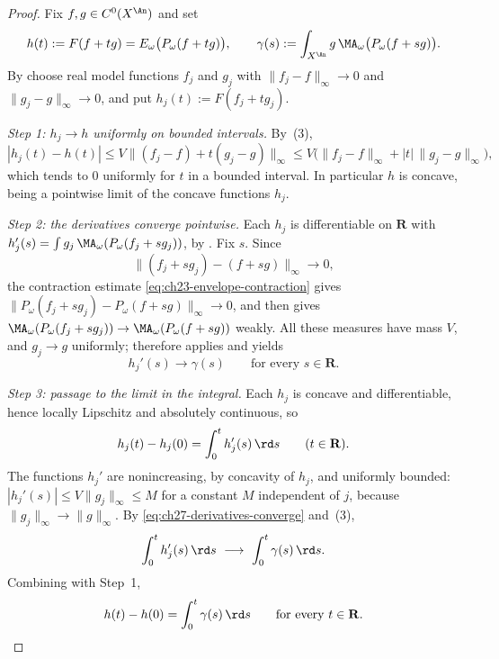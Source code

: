 \begin{proof}
Fix \(f,g\in C^0(X^{\An})\) and set
\[
 h(t):=F(f+tg)=E_\omega\bigl(P_\omega(f+tg)\bigr),
 \qquad
 \gamma(s):=\int_{X^{\An}}g\,\MA_\omega\bigl(P_\omega(f+sg)\bigr).
\]
By  choose real model functions \(f_j\) and
\(g_j\) with
\(\lVert f_j-f\rVert_\infty\to0\) and \(\lVert g_j-g\rVert_\infty\to0\), and
put \(h_j(t):=F(f_j+tg_j)\).

\emph{Step 1: \(h_j\to h\) uniformly on bounded intervals.}
By \,(3),
\[
 |h_j(t)-h(t)|
 \leq V\lVert (f_j-f)+t(g_j-g)\rVert_\infty
 \leq V\bigl(\lVert f_j-f\rVert_\infty
       +|t|\,\lVert g_j-g\rVert_\infty\bigr),
\]
which tends to \(0\) uniformly for \(t\) in a bounded interval.  In
particular \(h\) is concave, being a pointwise limit of the concave
functions \(h_j\).

\emph{Step 2: the derivatives converge pointwise.}
Each \(h_j\) is differentiable on \(\mathbf R\) with
\(h_j'(s)=\int g_j\,\MA_\omega(P_\omega(f_j+sg_j))\), by
.  Fix \(s\).  Since
\[
 \lVert (f_j+sg_j)-(f+sg)\rVert_\infty\longrightarrow0,
\]
the contraction estimate \eqref{eq:ch23-envelope-contraction} gives
\(\lVert P_\omega(f_j+sg_j)-P_\omega(f+sg)\rVert_\infty\to0\), and then
 gives
\(\MA_\omega(P_\omega(f_j+sg_j))\to\MA_\omega(P_\omega(f+sg))\) weakly.  All
these measures have mass \(V\), and \(g_j\to g\) uniformly; therefore
 applies and yields
\begin{equation}\label{eq:ch27-derivatives-converge}
 h_j'(s)\longrightarrow\gamma(s)
 \qquad\text{for every }s\in\mathbf R .
\end{equation}

\emph{Step 3: passage to the limit in the integral.}
Each \(h_j\) is concave and differentiable, hence locally Lipschitz and
absolutely continuous, so
\[
 h_j(t)-h_j(0)=\int_0^th_j'(s)\,\rd s
 \qquad(t\in\mathbf R).
\]
The functions \(h_j'\) are nonincreasing, by concavity of \(h_j\), and
uniformly bounded:
\(|h_j'(s)|\leq V\lVert g_j\rVert_\infty\leq M\) for a constant \(M\)
independent of \(j\), because \(\lVert g_j\rVert_\infty\to\lVert
g\rVert_\infty\).  By \eqref{eq:ch27-derivatives-converge} and
\,(3),
\[
 \int_0^th_j'(s)\,\rd s\ \longrightarrow\ \int_0^t\gamma(s)\,\rd s .
\]
Combining with Step~1,
\begin{equation}\label{eq:ch27-integrated-derivative}
 h(t)-h(0)=\int_0^t\gamma(s)\,\rd s
 \qquad\text{for every }t\in\mathbf R .
\end{equation}


\end{proof}
